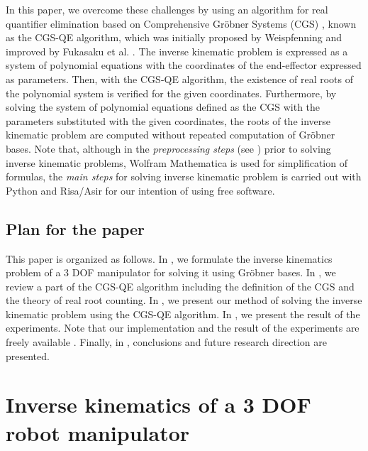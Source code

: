 \documentclass{birkjour}
\theoremstyle{plain}
\theoremstyle{definition}
\begin{document}
    In this paper, we overcome these challenges by using an algorithm for 
    real quantifier elimination based on Comprehensive Gr\"obner Systems (CGS)
    \cite{kap-sun-wan2010,mon2018,suz-sat2006},
    known as the CGS-QE algorithm, 
    which was initially proposed by Weispfenning \cite{wei1998} and improved by 
    Fukasaku et al. \cite{fuk-iwa-sat2015}.
    The inverse kinematic problem is expressed as a system of polynomial
    equations with the coordinates of the end-effector expressed as parameters.
    Then, with the CGS-QE algorithm, the existence of real roots of 
    the polynomial system is verified for the given coordinates. 
    Furthermore, by solving the system of polynomial equations defined as 
    the CGS with the parameters substituted with the given coordinates, 
    the roots of the inverse kinematic problem are computed without 
    repeated computation of Gr\"obner bases.
    Note that, although in the \emph{preprocessing steps} (see )
    prior to solving inverse kinematic problems, Wolfram Mathematica is used for
    simplification of formulas, the \emph{main steps} for solving 
    inverse kinematic problem is carried out with Python and Risa/Asir 
    for our intention of using free software.

    \subsection{Plan for the paper}

    This paper is organized as follows. In ,
    we formulate the inverse kinematics problem of a 3 DOF manipulator for solving it using Gr\"obner bases.
    In , we review a part of the CGS-QE algorithm including the 
    definition of the CGS and the theory of real root counting.
    In , we present our method of solving the inverse kinematic problem using the CGS-QE algorithm.
    In , we present the result of the experiments.
    Note that our implementation and the result of the experiments are freely available
    \cite{snac2021}.
    Finally, in , conclusions and future research direction are presented.

    \section{Inverse kinematics of a 3 DOF robot manipulator}
    \label{sec:inverse-kinematics}
\end{document}
